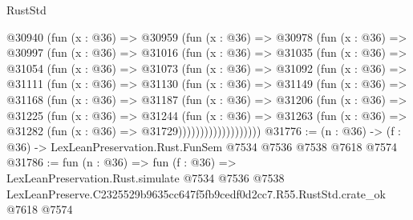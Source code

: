 \begin{lexlean}{RustStd}
\begin{coremodule}
  @30940
    (fun (x : @36) =>
    @30959
      (fun (x : @36) =>
      @30978
        (fun (x : @36) =>
        @30997
          (fun (x : @36) =>
          @31016
            (fun (x : @36) =>
            @31035
              (fun (x : @36) =>
              @31054
                (fun (x : @36) =>
                @31073
                  (fun (x : @36) =>
                  @31092
                    (fun (x : @36) =>
                    @31111
                      (fun (x : @36) =>
                      @31130
                        (fun (x : @36) =>
                        @31149
                          (fun (x : @36) =>
                          @31168
                            (fun (x : @36) =>
                            @31187
                              (fun (x : @36) =>
                              @31206
                                (fun (x : @36) =>
                                @31225
                                  (fun (x : @36) =>
                                  @31244
                                    (fun (x : @36) =>
                                    @31263
                                      (fun (x : @36) =>
                                      @31282 (fun (x : @36) => @31729)))))))))))))))))))
@31776 := (n : @36) -> (f : @36) -> LexLeanPreservation.Rust.FunSem @7534 @7536 @7538 @7618 @7574
@31786 := fun (n : @36) =>
  fun (f : @36) =>
  LexLeanPreservation.Rust.simulate
    @7534
    @7536
    @7538
    LexLeanPreserve.C2325529b9635cc647f5fb9cedf0d2cc7.R55.RustStd.crate_ok
    @7618
    @7574
\end{coremodule}
\end{lexlean}
